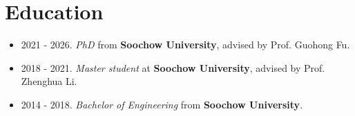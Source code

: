 \documentclass[a4paper,12pt]{article}
\begin{document}
\section{Education}
\begin{itemize}[leftmargin=18pt]
      \item 2021 - 2026. \emph{PhD} from \textbf{Soochow University}, advised by Prof. Guohong Fu.
      \item 2018 - 2021. \emph{Master student} at \textbf{Soochow University}, advised by Prof. Zhenghua Li.
      \item 2014 - 2018. \emph{Bachelor of Engineering} from \textbf{Soochow University}.
\end{itemize}
\end{document}
